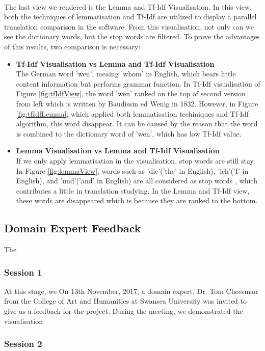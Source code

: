 \paragraph[]{} The last view we rendered is the Lemma and Tf-Idf Visualisation. In this view, both the techniques of lemmatisation and Tf-Idf are utilized to display a parallel translation comparison in the software. From this visualisation, not only can we see the dictionary words, but the stop words are filtered. To prove the advantages of this results, two comparison is necessary:
\begin{itemize} 	
	\item \textbf{Tf-Idf Visualisation vs Lemma and Tf-Idf Visualisation}\\
     The German word 'wen', meaing 'whom' in English, which bears little content information but performs grammar function. In Tf-Idf visualisation of Figure  \ref{fig:tfIdfView}, the word 'wen' ranked on the top of second version from left which is written by Baudissin ed Wenig in 1832\cite{Hotho2005}. However, in Figure \ref{fig:tfIdfLemma}, which applied both lemmatisation techiniques and Tf-Idf algorithm, this word disappear. It can be caused by the reason that the word is combined to the dictionary word of 'wen', which has low Tf-Idf value.
	\item \textbf{Lemma Visualisation vs Lemma and Tf-Idf Visualisation}\\
	If we only apply lemmatisation in the visualisation, stop words are still stay. In Figure \ref{fig:lemmaView}, words such as 'die'('the' in English), 'ich'('I' in English), and 'und'('and' in English) are all considered as stop words \cite{Hotho2005}, which contributes a little in translation studying. In the Lemma and Tf-Idf view, these words are disappeared which is because they are ranked to the bottom. 
\end{itemize}

\subsection{Domain Expert Feedback}
The 

\subsubsection{Session 1}

At this stage, we 
On 13th November, 2017, a domain expert, Dr. Tom Cheesman from the College of Art and Humanities at Swansea University was invited to give us a feedback for the project. During the meeting, we demonstrated the visualisation

\subsubsection{Session 2}